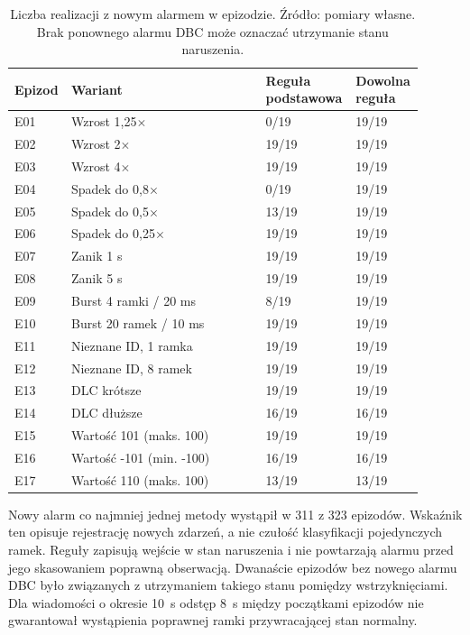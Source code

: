 \begin{table}[htbp]
\centering
\small
\caption{Liczba realizacji z nowym alarmem w epizodzie. Źródło: pomiary własne.
Brak ponownego alarmu DBC może oznaczać utrzymanie stanu naruszenia.}
\label{tab:wyniki-macierz-alarmy}
\setlength{\tabcolsep}{3pt}
\begin{tabular}{p{0.07\linewidth}p{0.47\linewidth}p{0.20\linewidth}p{0.16\linewidth}}
\hline
Epizod & Wariant & Reguła podstawowa & Dowolna reguła \\
\hline
E01 & Wzrost 1,25$\times$ & 0/19 & 19/19 \\
E02 & Wzrost 2$\times$ & 19/19 & 19/19 \\
E03 & Wzrost 4$\times$ & 19/19 & 19/19 \\
E04 & Spadek do 0,8$\times$ & 0/19 & 19/19 \\
E05 & Spadek do 0,5$\times$ & 13/19 & 19/19 \\
E06 & Spadek do 0,25$\times$ & 19/19 & 19/19 \\
E07 & Zanik 1 s & 19/19 & 19/19 \\
E08 & Zanik 5 s & 19/19 & 19/19 \\
E09 & Burst 4 ramki / 20 ms & 8/19 & 19/19 \\
E10 & Burst 20 ramek / 10 ms & 19/19 & 19/19 \\
E11 & Nieznane ID, 1 ramka & 19/19 & 19/19 \\
E12 & Nieznane ID, 8 ramek & 19/19 & 19/19 \\
E13 & DLC krótsze & 19/19 & 19/19 \\
E14 & DLC dłuższe & 16/19 & 16/19 \\
E15 & Wartość 101 (maks. 100) & 19/19 & 19/19 \\
E16 & Wartość -101 (min. -100) & 16/19 & 16/19 \\
E17 & Wartość 110 (maks. 100) & 13/19 & 13/19 \\
\hline
\end{tabular}
\end{table}

Nowy alarm co najmniej jednej metody wystąpił w 311 z 323 epizodów.
Wskaźnik ten opisuje rejestrację nowych zdarzeń, a nie czułość klasyfikacji
pojedynczych ramek. Reguły zapisują wejście w stan naruszenia i nie powtarzają
alarmu przed jego skasowaniem poprawną obserwacją. Dwanaście epizodów bez
nowego alarmu DBC było związanych z utrzymaniem takiego stanu pomiędzy
wstrzyknięciami. Dla wiadomości o okresie 10~s odstęp 8~s między początkami
epizodów nie gwarantował wystąpienia poprawnej ramki przywracającej stan normalny.


